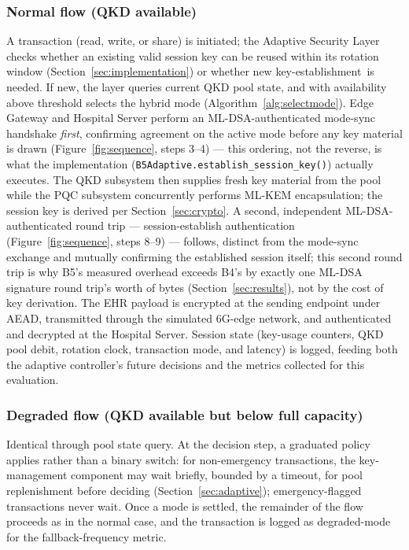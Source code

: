 \documentclass[journal]{IEEEtran}
\newcommand{\keyest}{key-establishment}
\begin{document}
\subsubsection{Normal flow (QKD available)}
A transaction (read, write, or share) is initiated; the Adaptive Security Layer checks whether an existing valid session key can be reused within its rotation window (Section~\ref{sec:implementation}) or whether new \keyest\ is needed. If new, the layer queries current QKD pool state, and with availability above threshold selects the hybrid mode (Algorithm~\ref{alg:selectmode}). Edge Gateway and Hospital Server perform an ML-DSA-authenticated mode-sync handshake \emph{first}, confirming agreement on the active mode before any key material is drawn (Figure~\ref{fig:sequence}, steps 3--4) --- this ordering, not the reverse, is what the implementation (\texttt{B5Adaptive.establish\_session\_key()}) actually executes. The QKD subsystem then supplies fresh key material from the pool while the PQC subsystem concurrently performs ML-KEM encapsulation; the session key is derived per Section~\ref{sec:crypto}. A second, independent ML-DSA-authenticated round trip --- session-establish authentication (Figure~\ref{fig:sequence}, steps 8--9) --- follows, distinct from the mode-sync exchange and mutually confirming the established session itself; this second round trip is why B5's measured overhead exceeds B4's by exactly one ML-DSA signature round trip's worth of bytes (Section~\ref{sec:results}), not by the cost of key derivation. The EHR payload is encrypted at the sending endpoint under AEAD, transmitted through the simulated 6G-edge network, and authenticated and decrypted at the Hospital Server. Session state (key-usage counters, QKD pool debit, rotation clock, transaction mode, and latency) is logged, feeding both the adaptive controller's future decisions and the metrics collected for this evaluation.

\subsubsection{Degraded flow (QKD available but below full capacity)}
Identical through pool state query. At the decision step, a graduated policy applies rather than a binary switch: for non-emergency transactions, the key-management component may wait briefly, bounded by a timeout, for pool replenishment before deciding (Section~\ref{sec:adaptive}); emergency-flagged transactions never wait. Once a mode is settled, the remainder of the flow proceeds as in the normal case, and the transaction is logged as degraded-mode for the fallback-frequency metric.
\end{document}
